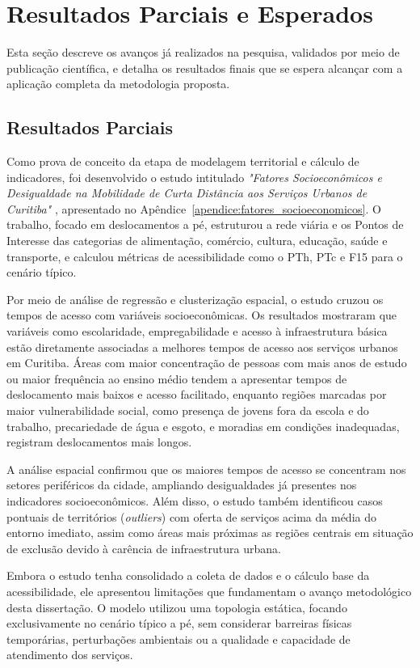 \section{Resultados Parciais e Esperados}
\label{sec:resultados}

Esta seção descreve os avanços já realizados na pesquisa, validados por meio de publicação científica, e detalha os resultados finais que se espera alcançar com a aplicação completa da metodologia proposta.

\subsection{Resultados Parciais}
Como prova de conceito da etapa de modelagem territorial e cálculo de indicadores, foi desenvolvido o estudo intitulado \textit{"Fatores Socioeconômicos e Desigualdade na Mobilidade de Curta Distância aos Serviços Urbanos de Curitiba"} \cite{sbbd_estendido}, apresentado no Apêndice~\ref{apendice:fatores_socioeconomicos}. O trabalho, focado em deslocamentos a pé, estruturou a rede viária e os Pontos de Interesse das categorias de alimentação, comércio, cultura, educação, saúde e transporte, e calculou métricas de acessibilidade como o PTh, PTc e F15 para o cenário típico.

Por meio de análise de regressão e clusterização espacial, o estudo cruzou os tempos de acesso com variáveis socioeconômicas. Os resultados mostraram que variáveis como escolaridade, empregabilidade e acesso à infraestrutura básica estão diretamente associadas a melhores tempos de acesso aos serviços urbanos em Curitiba. Áreas com maior concentração de pessoas com mais anos de estudo ou maior frequência ao ensino médio tendem a apresentar tempos de deslocamento mais baixos e acesso facilitado, enquanto regiões marcadas por maior vulnerabilidade social, como presença de jovens fora da escola e do trabalho, precariedade de água e esgoto, e moradias em condições inadequadas, registram deslocamentos mais longos. 

A análise espacial confirmou que os maiores tempos de acesso se concentram nos setores periféricos da cidade, ampliando desigualdades já presentes nos indicadores socioeconômicos. Além disso, o estudo também identificou casos pontuais de territórios (\textit{outliers}) com oferta de serviços acima da média do entorno imediato, assim como áreas mais próximas as regiões centrais em situação de exclusão devido à carência de infraestrutura urbana.

Embora o estudo tenha consolidado a coleta de dados e o cálculo base da acessibilidade, ele apresentou limitações que fundamentam o avanço metodológico desta dissertação. O modelo utilizou uma topologia estática, focando exclusivamente no cenário típico a pé, sem considerar barreiras físicas temporárias, perturbações ambientais ou a qualidade e capacidade de atendimento dos serviços.

